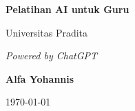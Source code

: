 \documentclass[11pt]{book}
\begin{document}
	
	\begin{titlepage}
		\centering
		\vspace*{1cm}
		
		\Huge
		\textbf{Pelatihan AI untuk Guru}
		
		\vspace{0.5cm}
		
		\LARGE
		Universitas Pradita
		
		\vspace{1.5cm}
		
		\textit{Powered by ChatGPT}
		
		\vspace{2cm}
		
		\textbf{Alfa Yohannis}
		
		\vspace{0.8cm}
		
		\today
		
		\vfill
	\end{titlepage}
	
	\tableofcontents
	
	
	
	
	
	
	

	\backmatter
	
	
\end{document}
